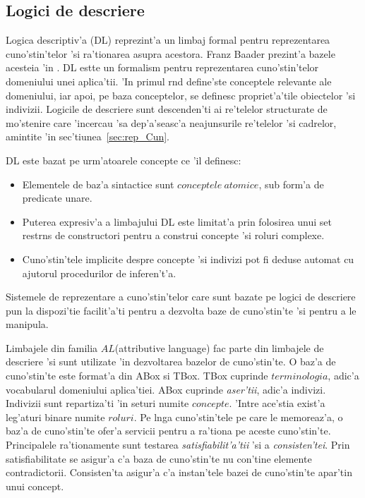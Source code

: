 \documentclass[12pt,a4paper,twoside]{report}
\begin{document}
\subsection{Logici de descriere}

Logica descriptiv'a (DL) reprezint'a un limbaj formal  pentru reprezentarea cuno'stin'telor 'si ra'tionarea asupra acestora.
Franz Baader prezint'a bazele acesteia 'in \cite{BaaderBasicLogics}. DL estte un formalism pentru reprezentarea cuno'stin'telor domeniului unei aplica'tii. 'In primul r\ia nd define'ste conceptele relevante ale domeniului, iar apoi, pe baza conceptelor, se definesc propriet'a'tile obiectelor 'si indivizii. 
Logicile de descriere sunt descenden'ti ai re'telelor structurate de mo'stenire care 'incercau 'sa dep'a'seasc'a neajunsurile re'telelor 'si cadrelor, amintite 'in sec'tiunea~\ref{sec:rep_Cun}.

DL este bazat pe urm'atoarele concepte ce 'il definesc:
\begin{itemize}
    \item Elementele de baz'a sintactice sunt $conceptele\ atomice$, sub form'a de predicate unare.
    \item Puterea expresiv'a a limbajului DL este limitat'a prin folosirea unui set restr\ia ns de constructori pentru a construi concepte 'si roluri complexe.
    \item Cuno'stin'tele implicite despre concepte 'si indivizi pot fi deduse automat cu ajutorul procedurilor de inferen't'a.
\end{itemize}

Sistemele de reprezentare a cuno'stin'telor care sunt bazate pe logici de descriere pun la dispozi'tie facilit'a'ti pentru a dezvolta baze de cuno'stin'te 'si pentru a le manipula. 

Limbajele din familia $AL$(attributive language) fac parte din limbajele de descriere 'si sunt utilizate 'in dezvoltarea bazelor de cuno'stin'te.
O baz'a de cuno'stin'te este format'a din ABox si TBox. TBox cuprinde $terminologia$, adic'a vocabularul domeniului aplica'tiei. ABox cuprinde {\it aser'tii}, adic'a indivizi. Indivizii sunt repartiza'ti 'in seturi numite $concepte$. 'Intre ace'stia exist'a leg'aturi binare numite $roluri$. Pe l\ia nga cuno'stin'tele pe care le memoreaz'a, o baz'a de cuno'stin'te ofer'a servicii pentru a ra'tiona pe aceste cuno'stin'te. Principalele ra'tionamente sunt testarea {\it satisfiabilit'a'tii} 'si a {\it consisten'tei}. Prin satisfiabilitate se asigur'a c'a baza de cuno'stin'te nu con'tine elemente contradictorii. Consisten'ta asigur'a c'a instan'tele bazei de cuno'stin'te apar'tin unui concept.
\end{document}
